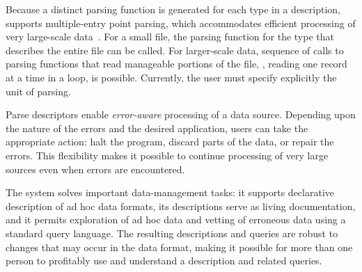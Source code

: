 Because a distinct parsing function is generated for each type in a
\pads{} description, \pads{} supports multiple-entry point parsing,
which accommodates efficient processing of very large-scale
data~\cite{fisher+:pldi05}.  For a small file, the parsing function
for the \pads{} type that describes the entire file can be called.
For larger-scale data, sequence of calls to parsing functions that
read manageable portions of the file, \eg{}, reading one record at a
time in a loop, is possible.  Currently, the user must specify
explicitly the unit of parsing.

Parse descriptors enable \emph{error-aware} processing of a data
source.  Depending upon the nature of the errors and the desired
application, users can take the appropriate action: halt the program,
discard parts of the data, or repair the errors.  This flexibility
makes it possible to continue processing of very large sources even
when errors are encountered.

The \pads{} system solves important data-management tasks: it supports
declarative description of ad hoc data formats, its descriptions serve
as living documentation, and it permits exploration of ad hoc data and
vetting of erroneous data using a standard query language.  The
resulting \pads{} descriptions and queries are robust to changes that
may occur in the data format, making it possible for more than one
person to profitably use and understand a \pads{} description and
related queries.



